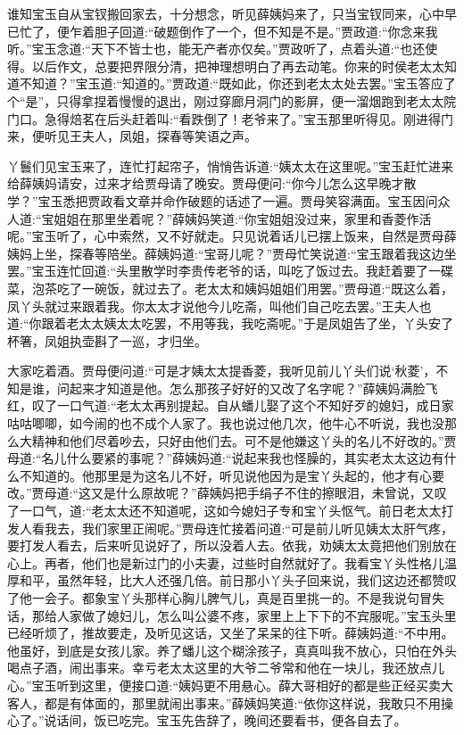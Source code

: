 \begin{parag}
\end{parag}


\begin{parag}
    谁知宝玉自从宝钗搬回家去，十分想念，听见薛姨妈来了，只当宝钗同来，心中早已忙了，便乍着胆子回道:“破题倒作了一个，但不知是不是。”贾政道:“你念来我听。”宝玉念道:“天下不皆士也，能无产者亦仅矣。”贾政听了，点着头道:“也还使得。以后作文，总要把界限分清，把神理想明白了再去动笔。你来的时侯老太太知道不知道？”宝玉道:“知道的。”贾政道:“既如此，你还到老太太处去罢。”宝玉答应了个“是”，只得拿捏着慢慢的退出，刚过穿廊月洞门的影屏，便一溜烟跑到老太太院门口。急得焙茗在后头赶着叫:“看跌倒了！老爷来了。”宝玉那里听得见。刚进得门来，便听见王夫人，凤姐，探春等笑语之声。
\end{parag}


\begin{parag}
    丫鬟们见宝玉来了，连忙打起帘子，悄悄告诉道:“姨太太在这里呢。”宝玉赶忙进来给薛姨妈请安，过来才给贾母请了晚安。贾母便问:“你今儿怎么这早晚才散学？”宝玉悉把贾政看文章并命作破题的话述了一遍。贾母笑容满面。宝玉因问众人道:“宝姐姐在那里坐着呢？”薛姨妈笑道:“你宝姐姐没过来，家里和香菱作活呢。”宝玉听了，心中索然，又不好就走。只见说着话儿已摆上饭来，自然是贾母薛姨妈上坐，探春等陪坐。薛姨妈道:“宝哥儿呢？”贾母忙笑说道:“宝玉跟着我这边坐罢。”宝玉连忙回道:“头里散学时李贵传老爷的话，叫吃了饭过去。我赶着要了一碟菜，泡茶吃了一碗饭，就过去了。老太太和姨妈姐姐们用罢。”贾母道:“既这么着，凤丫头就过来跟着我。你太太才说他今儿吃斋，叫他们自己吃去罢。”王夫人也道:“你跟着老太太姨太太吃罢，不用等我，我吃斋呢。”于是凤姐告了坐，丫头安了杯箸，凤姐执壶斟了一巡，才归坐。
\end{parag}


\begin{parag}
    大家吃着酒。贾母便问道:“可是才姨太太提香菱，我听见前儿丫头们说‘秋菱’，不知是谁，问起来才知道是他。怎么那孩子好好的又改了名字呢？”薛姨妈满脸飞红，叹了一口气道:“老太太再别提起。自从蟠儿娶了这个不知好歹的媳妇，成日家咕咕唧唧，如今闹的也不成个人家了。我也说过他几次，他牛心不听说，我也没那么大精神和他们尽着吵去，只好由他们去。可不是他嫌这丫头的名儿不好改的。”贾母道:“名儿什么要紧的事呢？”薛姨妈道:“说起来我也怪臊的，其实老太太这边有什么不知道的。他那里是为这名儿不好，听见说他因为是宝丫头起的，他才有心要改。”贾母道:“这又是什么原故呢？”薛姨妈把手绢子不住的擦眼泪，未曾说，又叹了一口气，道:“老太太还不知道呢，这如今媳妇子专和宝丫头怄气。前日老太太打发人看我去，我们家里正闹呢。”贾母连忙接着问道:“可是前儿听见姨太太肝气疼，要打发人看去，后来听见说好了，所以没着人去。依我，劝姨太太竟把他们别放在心上。再者，他们也是新过门的小夫妻，过些时自然就好了。我看宝丫头性格儿温厚和平，虽然年轻，比大人还强几倍。前日那小丫头子回来说，我们这边还都赞叹了他一会子。都象宝丫头那样心胸儿脾气儿，真是百里挑一的。不是我说句冒失话，那给人家做了媳妇儿，怎么叫公婆不疼，家里上上下下的不宾服呢。”宝玉头里已经听烦了，推故要走，及听见这话，又坐了呆呆的往下听。薛姨妈道:“不中用。他虽好，到底是女孩儿家。养了蟠儿这个糊涂孩子，真真叫我不放心，只怕在外头喝点子酒，闹出事来。幸亏老太太这里的大爷二爷常和他在一块儿，我还放点儿心。”宝玉听到这里，便接口道:“姨妈更不用悬心。薛大哥相好的都是些正经买卖大客人，都是有体面的，那里就闹出事来。”薛姨妈笑道:“依你这样说，我敢只不用操心了。”说话间，饭已吃完。宝玉先告辞了，晚间还要看书，便各自去了。
\end{parag}


